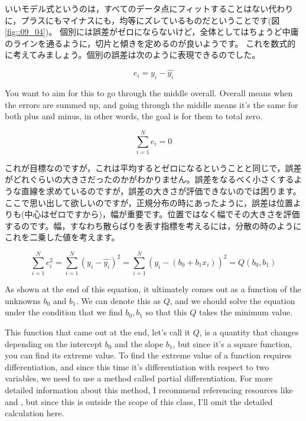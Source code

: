 \documentclass{ltjbook}
\begin{document}
いいモデル式というのは，すべてのデータ点にフィットすることはない代わりに，プラスにもマイナスにも，均等にズレているものだということです(図\ref{fig::09_04})。
個別には誤差がゼロにならないけど，全体としてはちょうど中庸のラインを通るように，切片と傾きを定めるのが良いようです。
これを数式的に考えてみましょう。個別の誤差は次のように表現できるのでした。

\[e_i = y_i - \hat{y_i} \]

You want to aim for this to go through the middle overall. Overall means when the errors are summed up, and going through the middle means it's the same for both plus and minus, in other words, the goal is for them to total zero.

\[\sum_{i=1}^N e_i = 0 \]

これが目標なのですが，これは平均するとゼロになるということと同じで，誤差がどれぐらいの大きさだったのかがわかりません。誤差をなるべく小さくするような直線を求めているのですが，誤差の大きさが評価できないのでは困ります。
ここで思い出して欲しいのですが，正規分布の時にあったように，誤差は位置よりも(中心はゼロですから)，幅が重要です。位置ではなく幅でその大きさを評価するのです。幅，すなわち散らばりを表す指標を考えるには，分散の時のようにこれを二乗した値を考えます。

\[\sum_{i=1}^N e_i^2=\sum_{i=1}^N (y_i - \hat{y_i})^2 = \sum_{i=1}^N (y_i - (b_0 + b_1x_i))^2=Q(b_0,b_1) \]

As shown at the end of this equation, it ultimately comes out as a function of the unknowns $b_0$ and $b_1$. We can denote this as $Q$, and we should solve the equation under the condition that we find $b_0, b_1$ so that this $Q$ takes the minimum value.

This function that came out at the end, let's call it $Q$, is a quantity that changes depending on the intercept $b_0$ and the slope $b_1$, but since it's a square function, you can find its extreme value. To find the extreme value of a function requires differentiation, and since this time it's differentiation with respect to two variables, we need to use a method called partial differentiation. For more detailed information about this method, I recommend referencing resources like \textcite{kosugi2018} and \textcite{Nishiuchi201712}, but since this is outside the scope of this class, I'll omit the detailed calculation here.
\end{document}
